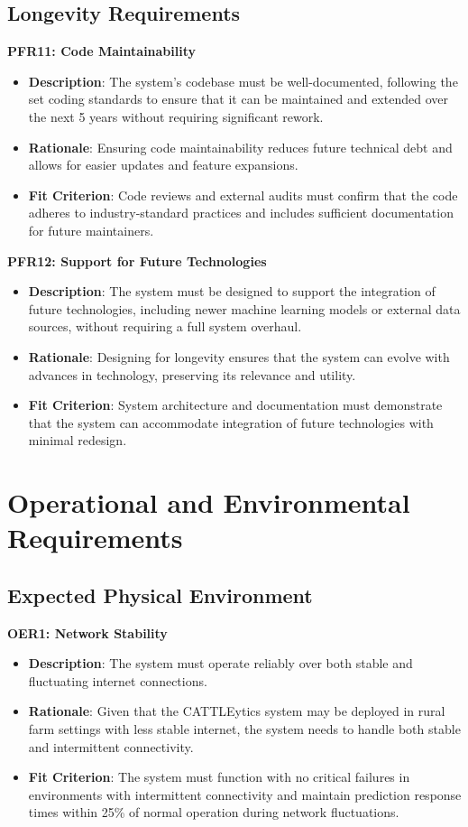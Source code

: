 \documentclass[12pt]{article}
\begin{document}
\subsection{Longevity Requirements}
\textbf{PFR11: Code Maintainability}
\begin{itemize}
    \item \textbf{Description}: The system’s codebase must be well-documented,
    following the set coding standards to ensure that it can be maintained and
    extended over the next 5 years without requiring significant rework.
    \item \textbf{Rationale}: Ensuring code maintainability reduces future
    technical debt and allows for easier updates and feature expansions.
    \item \textbf{Fit Criterion}: Code reviews and external audits must confirm
    that the code adheres to industry-standard practices and includes sufficient
    documentation for future maintainers.
\end{itemize}
\textbf{PFR12: Support for Future Technologies}
\begin{itemize}
    \item \textbf{Description}: The system must be designed to support the
    integration of future technologies, including newer machine learning models
    or external data sources, without requiring a full system overhaul.
    \item \textbf{Rationale}: Designing for longevity ensures that the system
    can evolve with advances in technology, preserving its relevance and
    utility.
    \item \textbf{Fit Criterion}:  System architecture and documentation must
    demonstrate that the system can accommodate integration of future
    technologies with minimal redesign.
\end{itemize}


\section{Operational and Environmental Requirements}
\subsection{Expected Physical Environment}
\textbf{OER1: Network Stability}
\begin{itemize}
    \item \textbf{Description}: The system must operate reliably over both
    stable and fluctuating internet connections.
    \item \textbf{Rationale}: Given that the CATTLEytics system may be deployed
    in rural farm settings with less stable internet, the system needs to handle
    both stable and intermittent connectivity.
    \item \textbf{Fit Criterion}: The system must function with no critical
    failures in environments with intermittent connectivity and maintain
    prediction response times within 25\% of normal operation during network
    fluctuations.
\end{itemize}
\end{document}
